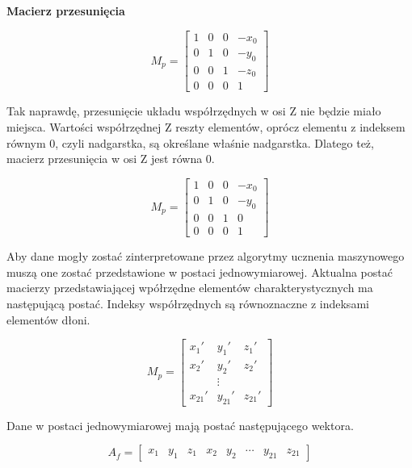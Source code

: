 \quad \textbf{Macierz przesunięcia}

\begin{equation*}
    M_p = 
    \begin{bmatrix}
    1 & 0 & 0 & -x_0 \\
    0 & 1 & 0 & -y_0 \\
    0 & 0 & 1 & -z_0 \\
    0 & 0 & 0 & 1
    \end{bmatrix}
\end{equation*}

\quad Tak naprawdę, przesunięcie układu współrzędnych w osi Z nie będzie miało miejsca. Wartości współrzędnej Z reszty elementów, oprócz elementu z indeksem równym 0, czyli nadgarstka, są określane właśnie nadgarstka. Dlatego też, macierz przesunięcia w osi Z jest równa 0. 

\begin{equation*}
    M_p = 
    \begin{bmatrix}
    1 & 0 & 0 & -x_0 \\
    0 & 1 & 0 & -y_0 \\
    0 & 0 & 1 & 0 \\
    0 & 0 & 0 & 1
    \end{bmatrix}
\end{equation*}

\quad Aby dane mogły zostać zinterpretowane przez algorytmy ucznenia maszynowego muszą one zostać przedstawione w postaci jednowymiarowej. Aktualna postać macierzy przedstawiającej wpółrzędne elementów charakterystycznych ma następującą postać. Indeksy współrzędnych są równoznaczne z indeksami elementów dłoni. 

\begin{equation*}
    M_p = 
    \begin{bmatrix}
    x_1' & y_1' & z_1' \\
    x_2' & y_2' & z_2' \\
        & \vdots &     \\
    x_{21}' & y_{21}' & z_{21}'
    \end{bmatrix}
\end{equation*}

Dane w postaci jednowymiarowej mają postać następującego wektora. 

\begin{equation*}
    A_f=
    \begin{bmatrix}
        x_1 & y_1 & z_1 & x_2 & y_2 & \cdots & y_{21} & z_{21}
    \end{bmatrix}
\end{equation*}


